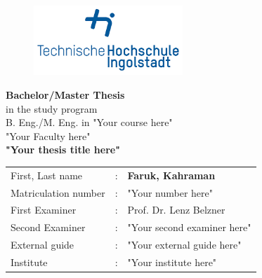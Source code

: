 

\begin{titlepage}	
		\begin{figure}[!h]
			\centering
			\includegraphics[width={0.5\textwidth}]{images/thiRGB.jpg}	
		\end{figure}																			
	
	\begin{center}
		\hrulefill 
	\end{center}
	
	
	\begin{center}	
		\vspace{1cm}
		
		\huge\textbf{
			Bachelor/Master Thesis}\\[1em]
		\normalsize
			in the study program \\ B. Eng./M. Eng. in "Your course here"\\ "Your Faculty here"\\ [8em]
	
		\Large\textbf{"Your thesis title here"}	 \\ [10em]

	\end{center}
	
	
	\begin{tabular}{lll}
		First, Last name &:& \textbf{Faruk, Kahraman}	\\ [1em]
		
		Matriculation number &:& "Your number here" \\[3em]
		
		First Examiner &:& Prof. Dr. Lenz Belzner	\\ [1em]
		Second Examiner &:& "Your second examiner here"	\\ [2em]
		
		External guide &:& "Your external guide here" \\[3em]
		
		Institute &:& "Your institute here" \\
	\end{tabular}
	
\end{titlepage}

\restoregeometry
